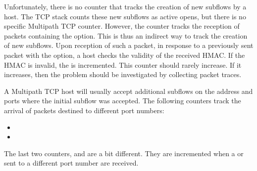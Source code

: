 \documentclass[letterpaper,10pt,english]{sphinxmanual}
\begin{document}
\sphinxAtStartPar
Unfortunately, there is no counter that tracks the creation of new subflows
by a host. The TCP stack counts these new subflows as active opens, but
there is no specific Multipath TCP counter. However, the
 counter tracks the reception of 
packets containing the  option. This is thus an indirect
way to track the creation of new subflows. Upon reception of such a
packet, in response to a previously sent  packet with the 
option, a host checks the validity of the received HMAC. If the HMAC is
invalid, the  is incremented. This counter
should rarely increase. If it increases, then the problem should be
investigated by collecting packet traces.
\def\sphinxLiteralBlockLabel{\label{\detokenize{mptcp-linux:id17}}}
\begin{sphinxVerbatim}[commandchars=\\\{\}]
\end{sphinxVerbatim}

\sphinxAtStartPar
A Multipath TCP host will usually accept additional subflows on the address
and ports where the initial subflow was accepted. The following counters
track the arrival of packets destined to different port numbers:
\begin{itemize}
\item {} 
\sphinxAtStartPar
{}

\item {} 
\sphinxAtStartPar
{}

\end{itemize}

\sphinxAtStartPar
The last two counters,  and
 are a bit different. They are incremented when
a  or  sent to a different port number are received.
\end{document}

